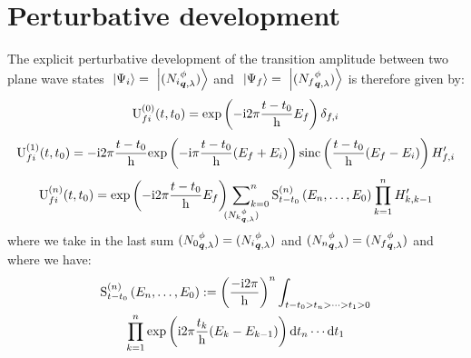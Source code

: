 \documentclass[10pt,a4paper,twoside,openany]{book}
\begin{document}
\section{Perturbative development}

The explicit perturbative development of the transition amplitude between two plane wave states $\ \left|{\Psi_i}\right\rangle = \ \left|{({N_i}^{\phi}_{{\boldsymbol{q}}, {\lambda}})}\right\rangle$ and $\ \left|{\Psi_f}\right\rangle = \ \left|{({N_f}^{\phi}_{{\boldsymbol{q}}, {\lambda}})}\right\rangle$ is therefore given by:
\begin{equation*}
\mathrm U_{{f}{i}}^{({0})}({t},{t_0}) = \mathrm{exp} \left( {-\mathrm{i} 2 \pi \frac{t - t_0} {\mathrm h} E_f} \right) \delta_{f,i}
\end{equation*}
\begin{equation*}
\mathrm U_{{f}{i}}^{({1})}({t},{t_0}) = -\mathrm{i} 2 \pi \frac{t - t_0} {\mathrm h} \mathrm{exp} \left( {-\mathrm{i} \pi \frac{t - t_0} {\mathrm h} ( E_f + E_i )} \right) \mathrm{sinc} \left( {\frac{t - t_0} {\mathrm h} ( E_f - E_i )} \right) H'_{f,i}
\end{equation*}
\begin{equation*}
\mathrm U_{{f}{i}}^{({n})}({t},{t_0}) = \mathrm{exp} \left( {-\mathrm{i} 2 \pi \frac{t - t_0} {\mathrm h} E_f} \right) \sideset{}{_{k=0}^n}\sum_{({N_k}^{\phi}_{{\boldsymbol{q}}, {\lambda}})} \mathrm S^{(n)}_{t - t_0}\left({E_n, \dotsc, E_0}\right) \prod_{k=1}^n H'_{k,k-1}
\end{equation*}
where we take in the last sum $({N_0}^{\phi}_{{\boldsymbol{q}}, {\lambda}}) = ({N_i}^{\phi}_{{\boldsymbol{q}}, {\lambda}})$ and $({N_n}^{\phi}_{{\boldsymbol{q}}, {\lambda}}) = ({N_f}^{\phi}_{{\boldsymbol{q}}, {\lambda}})$ and where we have:
\begin{multline*}
\mathrm S^{(n)}_{t - t_0}\left({E_n, \dotsc, E_0}\right) := \left( \frac{-\mathrm{i} 2 \pi} {\mathrm h} \right)^n \int_{t - t_0 > t_n > \dotsb > t_1 > 0} \\
\prod_{k=1}^n \mathrm{exp} \left( {\mathrm{i} 2 \pi \frac{t_k} {\mathrm h} ( E_k - E_{k - 1} )} \right) \mathrm dt_n \dotsm \mathrm dt_1
\end{multline*}
\end{document}
